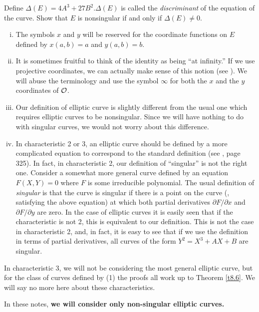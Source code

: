 \begin{exo}
\label{e2.4}
Define $\Delta(E)=4A^{3}+27B^{2}.\Delta(E)$ is called the {\it discriminant} of the equation of the curve. Show that $E$ is nonsingular if and only if $\Delta(E)\neq 0$.
\end{exo}

\rems

\begin{enumerate}[(i)]
\item The symbols $x$ and $y$ will be reserved for the coordinate functions on $E$ defined by $x(a,b)=a$ and $y(a,b)=b$.
\item
It is sometimes fruitful to think of the identity as being ``at infinity.'' If we use projective coordinates, we can actually make sense of this notion
(see \cite{r1.6}). We will abuse the terminology and use the symbol $\infty$ for both the $x$ and the $y$ coordinates of $\mathcal{O}$.
\item
Our definition of elliptic curve is slightly different from the usual one which requires elliptic curves to be nonsingular. Since we will have nothing to do with singular curves, we would not worry about this difference.
\item
In characteristic 2 or 3, an elliptic curve should be defined by a more complicated equation to correspond to the standard definition (see \cite{r1.6}, page 325). In fact, in characteristic 2, our definition of ``singular'' is not the right one. Consider a somewhat more general curve defined by an equation $F(X, Y)=0$ where $F$ is some irreducible polynomial. The usual definition of {\it singular} is that the curve is singular if there is a point on the curve (\ie, satisfying the above equation) at which both partial derivatives $\partial F/\partial x$ and $\partial F/\partial y$ are zero. In the case of elliptic curves it is easily seen that if the characteristic is not 2, this is equivalent to our definition. This is not the case in characteristic 2, and, in fact, it is easy to see that if we use the definition in terms of partial derivatives, all curves of the form $Y^{2}=X^{3}+AX+B$ are singular.
\end{enumerate}

In characteristic 3, we will not be considering the most general elliptic curve, but for the class of curves defined by (1) the proofs all work up to Theorem \ref{t8.6}. We will say no more here about these characteristics. 

In these notes, \textbf{we will consider only non-singular elliptic curves.}


